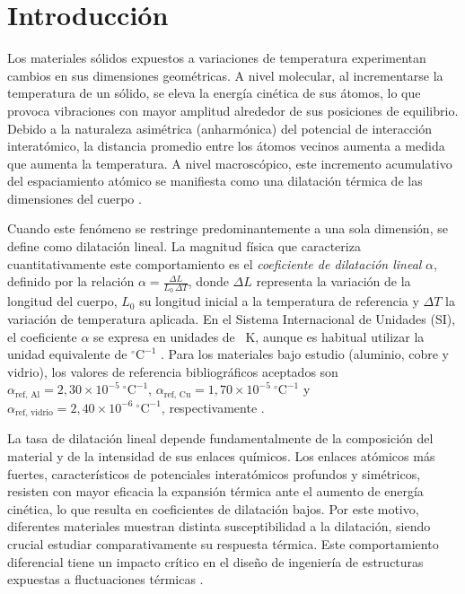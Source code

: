 
\section{Introducción}

Los materiales sólidos expuestos a variaciones de temperatura experimentan cambios en sus dimensiones geométricas. A nivel molecular, al incrementarse la temperatura de un sólido, se eleva la energía cinética de sus átomos, lo que provoca vibraciones con mayor amplitud alrededor de sus posiciones de equilibrio. Debido a la naturaleza asimétrica (anharmónica) del potencial de interacción interatómico, la distancia promedio entre los átomos vecinos aumenta a medida que aumenta la temperatura. A nivel macroscópico, este incremento acumulativo del espaciamiento atómico se manifiesta como una dilatación térmica de las dimensiones del cuerpo \cite{serway}.

Cuando este fenómeno se restringe predominantemente a una sola dimensión, se define como dilatación lineal. La magnitud física que caracteriza cuantitativamente este comportamiento es el \textit{coeficiente de dilatación lineal} $\alpha$, definido por la relación $\alpha = \frac{\Delta L}{L_0\,\Delta T}$, donde $\Delta L$ representa la variación de la longitud del cuerpo, $L_0$ su longitud inicial a la temperatura de referencia y $\Delta T$ la variación de temperatura aplicada. En el Sistema Internacional de Unidades (SI), el coeficiente $\alpha$ se expresa en unidades de \unit{\per\kelvin}, aunque es habitual utilizar la unidad equivalente de $^\circ\text{C}^{-1}$ \cite{halliday}. Para los materiales bajo estudio (aluminio, cobre y vidrio), los valores de referencia bibliográficos aceptados son $\alpha_{\text{ref, Al}} = 2{,}30 \times 10^{-5}\ ^\circ\text{C}^{-1}$, $\alpha_{\text{ref, Cu}} = 1{,}70 \times 10^{-5}\ ^\circ\text{C}^{-1}$ y $\alpha_{\text{ref, vidrio}} = 2{,}40 \times 10^{-6}\ ^\circ\text{C}^{-1}$, respectivamente \cite{serway}.

\label{sec:introduccion}

La tasa de dilatación lineal depende fundamentalmente de la composición del material y de la intensidad de sus enlaces químicos. Los enlaces atómicos más fuertes, característicos de potenciales interatómicos profundos y simétricos, resisten con mayor eficacia la expansión térmica ante el aumento de energía cinética, lo que resulta en coeficientes de dilatación bajos. Por este motivo, diferentes materiales muestran distinta susceptibilidad a la dilatación, siendo crucial estudiar comparativamente su respuesta térmica. Este comportamiento diferencial tiene un impacto crítico en el diseño de ingeniería de estructuras expuestas a fluctuaciones térmicas \cite{serway}.

